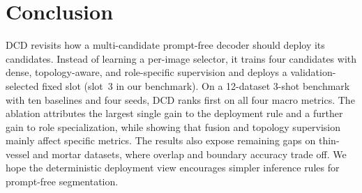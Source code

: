 \section{Conclusion}
\label{sec:conclusion}

DCD revisits how a multi-candidate prompt-free decoder should deploy its
candidates.  Instead of learning a per-image selector, it trains four
candidates with dense, topology-aware, and role-specific supervision and
deploys a validation-selected fixed slot (slot~3 in our benchmark).  On a 12-dataset 3-shot
benchmark with ten baselines and four seeds, DCD ranks first on all four
macro metrics.  The ablation attributes the largest single gain to the
deployment rule and a further gain to role specialization, while showing
that fusion and topology supervision mainly affect specific metrics.  The
results also expose remaining gaps on thin-vessel and mortar datasets, where
overlap and boundary accuracy trade off.  We hope the deterministic
deployment view encourages simpler inference rules for prompt-free
segmentation.
